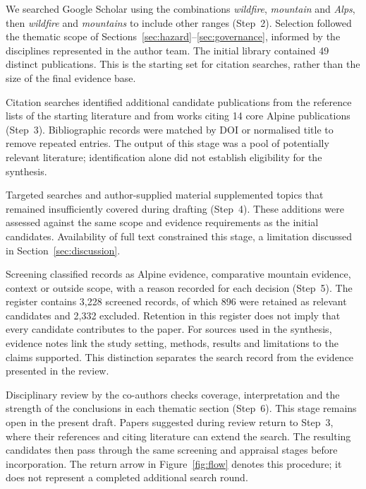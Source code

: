 \documentclass[11pt,a4paper]{article}
\begin{document}
We searched Google Scholar using the combinations \emph{wildfire}, \emph{mountain} and \emph{Alps}, then \emph{wildfire} and \emph{mountains} to include other ranges (Step~2). Selection followed the thematic scope of Sections~\ref{sec:hazard}--\ref{sec:governance}, informed by the disciplines represented in the author team. The initial library contained 49 distinct publications. This is the starting set for citation searches, rather than the size of the final evidence base.

Citation searches identified additional candidate publications from the reference lists of the starting literature and from works citing 14 core Alpine publications (Step~3). Bibliographic records were matched by DOI or normalised title to remove repeated entries. The output of this stage was a pool of potentially relevant literature; identification alone did not establish eligibility for the synthesis.

Targeted searches and author-supplied material supplemented topics that remained insufficiently covered during drafting (Step~4). These additions were assessed against the same scope and evidence requirements as the initial candidates. Availability of full text constrained this stage, a limitation discussed in Section~\ref{sec:discussion}.

Screening classified records as Alpine evidence, comparative mountain evidence, context or outside scope, with a reason recorded for each decision (Step~5). The register contains 3{,}228 screened records, of which 896 were retained as relevant candidates and 2{,}332 excluded. Retention in this register does not imply that every candidate contributes to the paper. For sources used in the synthesis, evidence notes link the study setting, methods, results and limitations to the claims supported. This distinction separates the search record from the evidence presented in the review.

Disciplinary review by the co-authors checks coverage, interpretation and the strength of the conclusions in each thematic section (Step~6). This stage remains open in the present draft. Papers suggested during review return to Step~3, where their references and citing literature can extend the search. The resulting candidates then pass through the same screening and appraisal stages before incorporation. The return arrow in Figure~\ref{fig:flow} denotes this procedure; it does not represent a completed additional search round.
\end{document}
